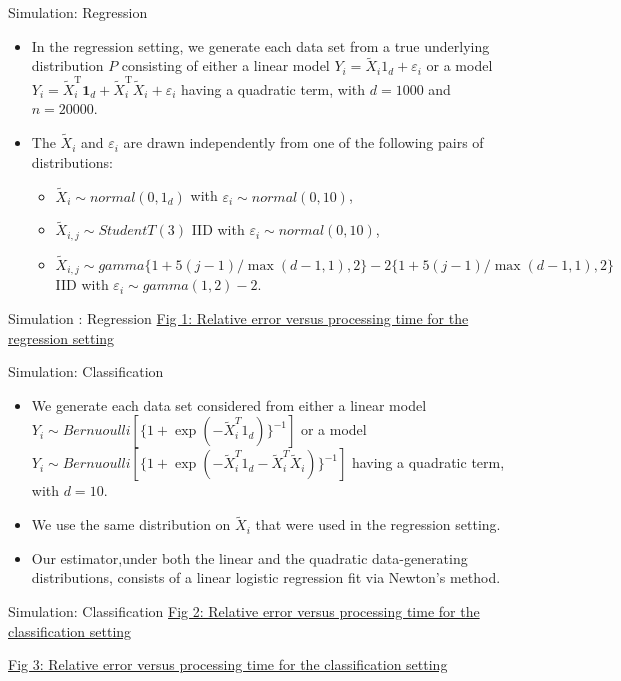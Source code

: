 \documentclass[12pt]{beamer}
\begin{document}
\begin{frame}{Simulation: Regression}
\begin{itemize}
\item In the regression setting, we generate each data set from a true underlying distribution $P$ consisting of either a linear model $Y_i=\tilde{X}_i1_{d}+\varepsilon_i$ or a model $Y_{i}=\tilde{X}_{i}^{\mathrm{T}} \mathbf{1}_{d}+\tilde{X}_{i}^{\mathrm{T}} \tilde{X}_{i}+\varepsilon_{i}$ having
a quadratic term, with $d=1000$ and $n=20000$.
\item The $\tilde{X}_i$ and $\varepsilon_i$ are drawn independently from one of the following pairs of distributions: 
\begin{itemize}
\item $\tilde{X}_i\sim normal(0,1_{d})$ with $\varepsilon_i \sim normal(0,10)$,
\item $\tilde{X}_{i,j}\sim StudentT(3)$ IID with $\varepsilon_i \sim normal(0,10)$,
\item $\tilde{X}_{i,j}\sim gamma\{1+5(j-1)/\max(d-1,1),2\}-2\{1+5(j-1)/\max(d-1,1),2\}$ IID with $\varepsilon_i \sim gamma(1,2)-2$.
\end{itemize} 
\end{itemize}
\end{frame}

\begin{frame}{Simulation : Regression}
\href{fig1.png}{\color{blue} Fig 1: Relative error versus processing time for the regression setting}
\end{frame}

\begin{frame}{Simulation: Classification}
\begin{itemize}
\item We generate each data set considered from either a linear model $Y_i\sim Bernuoulli[\{1+\exp(-\tilde{X}_i^T1_{d})\}^{-1}]$ or a model $Y_i\sim Bernuoulli[\{1+\exp(-\tilde{X}_i^T1_{d}-\tilde{X}_i^T\tilde{X}_i)\}^{-1}]$ having a quadratic term, with $d=10$.
\item We use the same distribution on $\tilde{X}_i$ that were used in the regression setting.
\item Our estimator,under both the linear and the quadratic data-generating distributions, consists of a linear logistic regression fit via Newton's method. 
\end{itemize}
\end{frame}

\begin{frame}{Simulation: Classification}
\href{fig2.png}{\color{blue} Fig 2: Relative error versus processing time for the classification setting}

\href{fig3.png}{\color{blue} Fig 3: Relative error versus processing time for the classification setting}
\end{frame}
\end{document}
